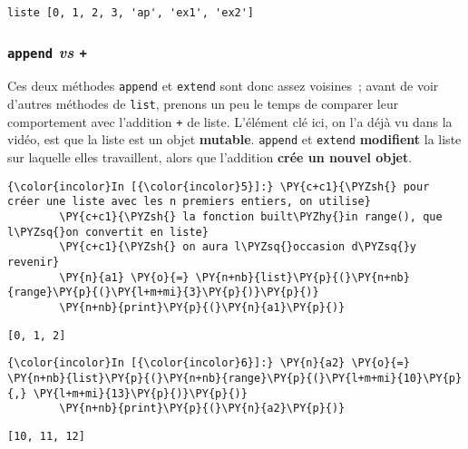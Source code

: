     \begin{Verbatim}[commandchars=\\\{\}]
liste [0, 1, 2, 3, 'ap', 'ex1', 'ex2']

    \end{Verbatim}

    \hypertarget{append-vs}{%
\subsubsection{\texorpdfstring{\texttt{append} \emph{vs}
\texttt{+}}{append vs +}}\label{append-vs}}

    Ces deux méthodes \texttt{append} et \texttt{extend} sont donc assez
voisines~; avant de voir d'autres méthodes de \texttt{list}, prenons un
peu le temps de comparer leur comportement avec l'addition \texttt{+} de
liste. L'élément clé ici, on l'a déjà vu dans la vidéo, est que la liste
est un objet \textbf{mutable}. \texttt{append} et \texttt{extend}
\textbf{modifient} la liste sur laquelle elles travaillent, alors que
l'addition \textbf{crée un nouvel objet}.

    \begin{Verbatim}[commandchars=\\\{\}]
{\color{incolor}In [{\color{incolor}5}]:} \PY{c+c1}{\PYZsh{} pour créer une liste avec les n premiers entiers, on utilise}
        \PY{c+c1}{\PYZsh{} la fonction built\PYZhy{}in range(), que l\PYZsq{}on convertit en liste}
        \PY{c+c1}{\PYZsh{} on aura l\PYZsq{}occasion d\PYZsq{}y revenir}
        \PY{n}{a1} \PY{o}{=} \PY{n+nb}{list}\PY{p}{(}\PY{n+nb}{range}\PY{p}{(}\PY{l+m+mi}{3}\PY{p}{)}\PY{p}{)}
        \PY{n+nb}{print}\PY{p}{(}\PY{n}{a1}\PY{p}{)}
\end{Verbatim}


    \begin{Verbatim}[commandchars=\\\{\}]
[0, 1, 2]

    \end{Verbatim}

    \begin{Verbatim}[commandchars=\\\{\}]
{\color{incolor}In [{\color{incolor}6}]:} \PY{n}{a2} \PY{o}{=} \PY{n+nb}{list}\PY{p}{(}\PY{n+nb}{range}\PY{p}{(}\PY{l+m+mi}{10}\PY{p}{,} \PY{l+m+mi}{13}\PY{p}{)}\PY{p}{)}
        \PY{n+nb}{print}\PY{p}{(}\PY{n}{a2}\PY{p}{)}
\end{Verbatim}


    \begin{Verbatim}[commandchars=\\\{\}]
[10, 11, 12]

    \end{Verbatim}

